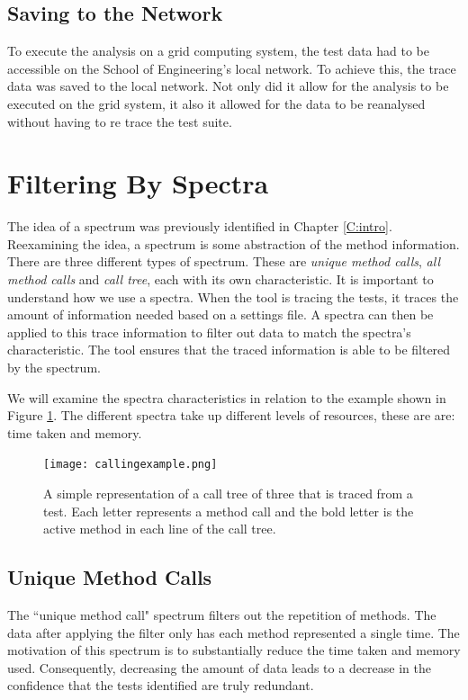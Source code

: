\subsection{Saving to the Network}
To execute the analysis on a grid computing system, the test data had to be accessible on the School of Engineering's local network. To achieve this, the trace data was saved to the local network. Not only did it allow for the analysis to be executed on the grid system, it also it allowed for the data to be reanalysed without having to re trace the test suite. 

\section{Filtering By Spectra }
\label{S:spectra}
The idea of a spectrum was previously identified in Chapter \ref{C:intro}. Reexamining the idea, a spectrum is some abstraction of the method information. There are three different types of spectrum. These are \textit{unique method calls}, \textit{all method calls} and \textit{call tree}, each with its own characteristic. It is important to understand how we use a spectra. When the tool is tracing the tests, it traces the amount of information needed based on a settings file. A spectra can then be applied to this trace information to filter out data to match the spectra's characteristic. The tool ensures that the traced information is able to be filtered by the spectrum. 

We will examine the spectra characteristics in relation to the example shown in Figure \ref{fig:callingexample}. The different spectra take up different levels of resources, these are are: time taken and memory. 


\begin{figure}[h]
\begin{center}
\texttt{[image: callingexample.png]}
\end{center}
\caption{A simple representation of a call tree of three that is traced from a test. Each letter represents a method call and the bold letter is the active method in each line of the call tree.}
\label{fig:callingexample}
\end{figure}

\subsection{Unique Method Calls}
The ``unique method call" spectrum filters out the repetition of methods. The data after applying the filter only has each method represented a single time. The motivation of this spectrum is to substantially reduce the time taken and memory used. Consequently, decreasing the amount of data leads to a decrease in the confidence that the tests identified are truly redundant. 


